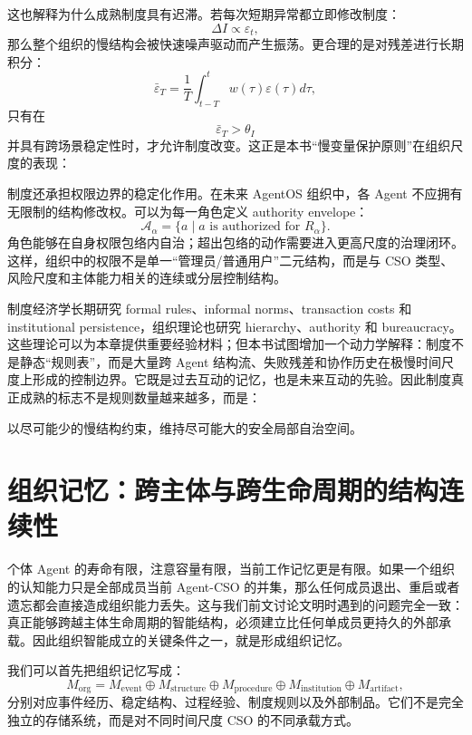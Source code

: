 这也解释为什么成熟制度具有迟滞。若每次短期异常都立即修改制度：
\[
\Delta I\propto\varepsilon_t,
\]
那么整个组织的慢结构会被快速噪声驱动而产生振荡。更合理的是对残差进行长期积分：
\[
\bar{\varepsilon}_T
=
\frac{1}{T}
\int_{t-T}^{t}
w(\tau)\varepsilon(\tau)d\tau,
\]
只有在
\[
\bar{\varepsilon}_T>\theta_I
\]
并具有跨场景稳定性时，才允许制度改变。这正是本书“慢变量保护原则”在组织尺度的表现：
\begin{statementbox}
\centering
{}
\end{statementbox}

制度还承担权限边界的稳定化作用。在未来 AgentOS 组织中，各 Agent 不应拥有无限制的结构修改权。可以为每一角色定义 authority envelope：
\[
\mathcal A_\alpha
=
\{
a\mid
a\text{ is authorized for }R_\alpha
\}.
\]
角色能够在自身权限包络内自治；超出包络的动作需要进入更高尺度的治理闭环。这样，组织中的权限不是单一“管理员/普通用户”二元结构，而是与 CSO 类型、风险尺度和主体能力相关的连续或分层控制结构。

制度经济学长期研究 formal rules、informal norms、transaction costs 和 institutional persistence，组织理论也研究 hierarchy、authority 和 bureaucracy。这些理论可以为本章提供重要经验材料；但本书试图增加一个动力学解释：制度不是静态“规则表”，而是大量跨 Agent 结构流、失败残差和协作历史在极慢时间尺度上形成的控制边界。它既是过去互动的记忆，也是未来互动的先验。因此制度真正成熟的标志不是规则数量越来越多，而是：
\begin{remark}
以尽可能少的慢结构约束，维持尽可能大的安全局部自治空间。
\end{remark}


\section{组织记忆：跨主体与跨生命周期的结构连续性}
\label{sec:organizational-memory}

个体 Agent 的寿命有限，注意容量有限，当前工作记忆更是有限。如果一个组织的认知能力只是全部成员当前 Agent-CSO 的并集，那么任何成员退出、重启或者遗忘都会直接造成组织能力丢失。这与我们前文讨论文明时遇到的问题完全一致：真正能够跨越主体生命周期的智能结构，必须建立比任何单成员更持久的外部承载。因此组织智能成立的关键条件之一，就是形成组织记忆。

我们可以首先把组织记忆写成：
\[
M_{\mathrm{org}}
=
M_{\mathrm{event}}
\oplus
M_{\mathrm{structure}}
\oplus
M_{\mathrm{procedure}}
\oplus
M_{\mathrm{institution}}
\oplus
M_{\mathrm{artifact}},
\]
分别对应事件经历、稳定结构、过程经验、制度规则以及外部制品。它们不是完全独立的存储系统，而是对不同时间尺度 CSO 的不同承载方式。

